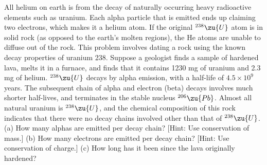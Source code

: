 All helium on earth is from the decay of naturally occurring heavy radioactive elements
 such as uranium. Each alpha particle that is emitted ends up claiming two electrons,
 which makes it a helium atom. If the original $^{238}\zu{U}$ atom is in solid
 rock (as opposed to the earth's molten regions), the He atoms are unable to
 diffuse out of the rock. This problem involves dating a rock using the known
 decay properties of uranium 238. Suppose a geologist finds a sample of hardened lava,
 melts it in a furnace, and finds that it contains 1230 mg of uranium
 and 2.3 mg of helium.  $^{238}\zu{U}$ decays by alpha emission, with a half-life
 of $4.5\times10^9$ years.  The subsequent chain of alpha and electron (beta) decays involves
 much shorter half-lives, and terminates in the 
stable nucleus $^{206}\zu{Pb}$.  Almost all natural
 uranium is $^{238}\zu{U}$, and the chemical composition
 of this rock indicates that there were
 no decay chains involved other than that of $^{238}\zu{U}$.\hwendpart
(a) How many alphas are emitted per decay chain? [Hint: Use conservation of mass.]\hwendpart
(b) How many electrons are emitted per decay chain?
  [Hint: Use conservation of charge.]\hwendpart
(c) How long has it been since the lava originally hardened?\answercheck
